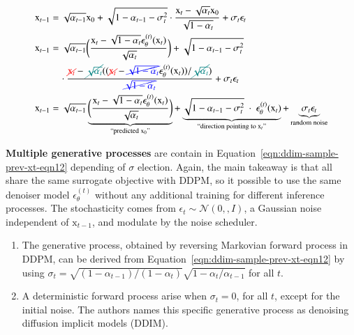 \begin{equation}\label{eqn:ddim-sample-prev-xt-eqn12}
    \begin{split}
    \mathrm{x}_{t-1} &= \sqrt{\alpha_{t-1}}\mathrm{x}_{0} + \sqrt{1-\alpha_{t-1}-\sigma_{t}^{2}}\cdot\frac{\mathrm{x}_{t} - \sqrt{\alpha_{t}}\mathrm{x}_{0}}{\sqrt{1-\alpha_{t}}} + \sigma_{t}\epsilon_{t} \\ 
    \mathrm{x}_{t-1} &= \sqrt{\alpha_{t-1}}\bigg(\frac{\mathrm{x}_{t} - \sqrt{1 - \alpha_{t}}\epsilon_{\theta}^{(t)}(\mathrm{x}_{t})}{\sqrt{\alpha_{t}}}\bigg) + \sqrt{1 - \alpha_{t-1} - \sigma_{t}^{2}} \\ &~~~~ \cdot\frac{\textcolor{red}{\cancel{\mathrm{x}_{t}}} - \textcolor{teal}{\cancel{\sqrt{\alpha_t}}}((\textcolor{red}{\cancel{\mathrm{x}_{t}}}-\textcolor{blue}{\cancel{\sqrt{1-\alpha_{t}}}}\epsilon_{\theta}^{(t)}(\mathrm{x}_{t})) / \textcolor{teal}{\cancel{\sqrt{\alpha_{t}}}})}{\textcolor{blue}{\cancel{\sqrt{1-\alpha_{t}}}}} + \sigma_{t}\epsilon_{t} \\
    \mathrm{x}_{t-1} &= 
    \sqrt{\alpha_{t-1}}\underbrace{\bigg(\frac{\mathrm{x}_{t}-\sqrt{1-\alpha_{t}}\epsilon_{\theta}^{(t)}(\mathrm{x}_{t})}{\sqrt{\alpha_{t}}}\bigg)}_{\text{``predicted $\mathrm{x}_{0}$''}} 
    + \underbrace{\sqrt{1-\alpha_{t-1} - \sigma^2_{t}}~\cdot~\epsilon_{\theta}^{(t)}(\mathrm{x}_{t})}_{\text{``direction pointing to $\mathrm{x}_{t}$''}}
    + \underbrace{\sigma_{t}\epsilon_{t}}_{\text{random noise}}
    \end{split}
\end{equation}

\noindent \textbf{Multiple generative processes} are contain in Equation~\ref{eqn:ddim-sample-prev-xt-eqn12} depending of $\sigma$ election. Again,
the main takeaway is that all share the same surrogate objective with DDPM, so
it possible to use the same denoiser model $\epsilon_{\theta}^{(t)}$ without any additional training for different inference processes. The stochasticity comes from $\epsilon_{t}\sim\mathcal{N}(0,, I)$, a Gaussian noise independent of $\mathrm{x}_{t-1}$, and modulate by the noise scheduler. \\

\begin{enumerate}
    \item The generative process, obtained by reversing Markovian forward process in DDPM, can be derived from Equation~\ref{eqn:ddim-sample-prev-xt-eqn12} by using $\sigma_{t} = \sqrt{(1-\alpha_{t-1}) / (1 - \alpha_{t})}\sqrt{1-\alpha_{t}/\alpha_{t-1}}$ for all $t$.
    \item A deterministic forward process arise when $\sigma_{t}=0$, for all $t$, except for the initial noise. The authors names this specific generative process as denoising diffusion implicit models (DDIM).
\end{enumerate}

